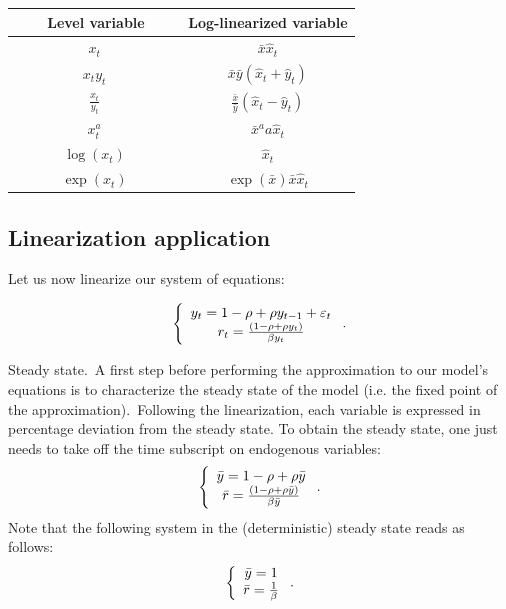 \documentclass[a4paper,12pt]{article}%
\begin{document}
\begin{center}%
\begin{tabular}
[c]{ll}\hline\hline
\ \ \ \ \textbf{Level variable \ \ \ } & \textbf{Log-linearized variable}%
\\\hline
\multicolumn{1}{c}{$x_{t}$} & \multicolumn{1}{c}{$\bar{x}\hat{x}_{t}$}\\
\multicolumn{1}{c}{$x_{t}y_{t}$} & \multicolumn{1}{c}{$\bar{x}\bar{y}(\hat
{x}_{t}+\hat{y}_{t})$}\\
\multicolumn{1}{c}{$\frac{x_{t}}{y_{t}}$} & \multicolumn{1}{c}{$\frac{\bar{x}%
}{\bar{y}}(\hat{x}_{t}-\hat{y}_{t})$}\\
\multicolumn{1}{c}{$x_{t}^{a}$} & \multicolumn{1}{c}{$\bar{x}^{a}a\hat{x}_{t}%
$}\\
\multicolumn{1}{c}{$\log(x_{t})$} & \multicolumn{1}{c}{$\hat{x}_{t}$}\\
\multicolumn{1}{c}{$\exp(x_{t})$} & \multicolumn{1}{c}{$\exp(\bar{x})\bar
{x}\hat{x}_{t}$}\\\hline
\end{tabular}

\end{center}

\subsection{Linearization application}

Let us now linearize our system of equations:%

\begin{equation}
\left\{
\begin{array}
[c]{c}%
y_{t}=1-\rho+\rho y_{t-1}+\varepsilon_{t}\\
r_{t}=\frac{\left(  1-\rho+\rho y_{t}\right)  }{\beta y_{t}}%
\end{array}
\right.  .
\end{equation}


\textsf{Steady state.\ }A first step before performing the approximation
to our model's equations is to characterize the steady state of the model
(i.e. the fixed point of the approximation).\ Following the linearization,
each variable is expressed in percentage deviation from the steady state. To
obtain the steady state, one just needs to take off the time subscript on
endogenous variables:%
\begin{equation}
\left\{
\begin{array}
[c]{c}%
\bar{y}=1-\rho+\rho\bar{y}\\
\bar{r}=\frac{\left(  1-\rho+\rho\bar{y}\right)  }{\beta\bar{y}}%
\end{array}
\right.  .
\end{equation}
Note that the following system in the (deterministic) steady state reads as
follows:%
\begin{equation}
\left\{
\begin{array}
[c]{c}%
\bar{y}=1\\
\bar{r}=\frac{1}{\beta}%
\end{array}
\right.  .
\end{equation}
\end{document}
